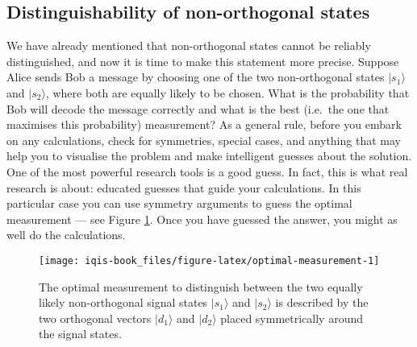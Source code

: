 \documentclass[fleqn]{article}
\begin{document}
\hypertarget{distinguishability-of-non-orthogonal-states}{%
\subsection{Distinguishability of non-orthogonal states}\label{distinguishability-of-non-orthogonal-states}}

We have already mentioned that non-orthogonal states cannot be reliably distinguished, and now it is time to make this statement more precise.
Suppose Alice sends Bob a message by choosing one of the two non-orthogonal states \(|s_1\rangle\) and \(|s_2\rangle\), where both are equally likely to be chosen.
What is the probability that Bob will decode the message correctly and what is the best (i.e.~the one that maximises this probability) measurement?
As a general rule, before you embark on any calculations, check for symmetries, special cases, and anything that may help you to visualise the problem and make intelligent guesses about the solution.
One of the most powerful research tools is a good guess.
In fact, this is what real research is about: educated guesses that guide your calculations.
In this particular case you can use symmetry arguments to guess the optimal measurement --- see Figure \ref{fig:optimal-measurement}.
Once you have guessed the answer, you might as well do the calculations.



\begin{figure}[H]

{\centering \texttt{[image: iqis-book\_files/figure-latex/optimal-measurement-1]} 

}

\caption{The optimal measurement to distinguish between the two equally likely non-orthogonal signal states \(|s_1\rangle\) and \(|s_2\rangle\) is described by the two orthogonal vectors \(|d_1\rangle\) and \(|d_2\rangle\) placed symmetrically around the signal states.}\label{fig:optimal-measurement}
\end{figure}
\end{document}
